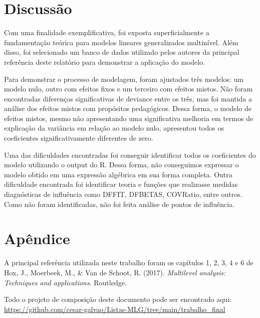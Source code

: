 \documentclass[
  letterpaper,
  DIV=11,
  numbers=noendperiod]{scrartcl}
\begin{document}
\newpage{}

\hypertarget{discussuxe3o}{%
\section{Discussão}\label{discussuxe3o}}

Com uma finalidade exemplificativa, foi exposta superficialmente a
fundamentação teórica para modelos lineares generalizados multinível.
Além disso, foi selecionado um banco de dados utilizado pelos autores da
principal referência deste relatório para demonstrar a aplicação do
modelo.

Para demonstrar o processo de modelagem, foram ajustados três modelos:
um modelo nulo, outro com efeitos fixos e um terceiro com efeitos
mistos. Não foram encontradas diferenças significativas de deviance
entre os três, mas foi mantida a análise dos efeitos mistos com
propósitos pedagógicos. Dessa forma, o modelo de efeitos mistos, mesmo
não apresentando uma significativa melhoria em termos de explicação da
variância em relação ao modelo nulo, apresentou todos os coeficientes
significativamente diferentes de zero.

Uma das dificuldades encontradas foi conseguir identificar todos os
coeficientes do modelo utilizando o output do R. Dessa forma, não
conseguimos expressar o modelo obtido em uma expressão algébrica em sua
forma completa. Outra dificuldade encontrada foi identificar teoria e
funções que realizasse medidas diagnósticas de influência como DFFIT,
DFBETAS, COVRatio, entre outros. Como não foram identificadas, não foi
feita análise de pontos de influência.

\newpage{}

\hypertarget{apuxeandice}{%
\section{Apêndice}\label{apuxeandice}}

A principal referência utilizada neste trabalho foram os capítulos 1, 2,
3, 4 e 6 de Hox, J., Moerbeek, M., \& Van de Schoot, R. (2017).
\emph{Multilevel analysis: Techniques and applications}. Routledge.

Todo o projeto de composição deste documento pode ser encontrado aqui:
\url{https://github.com/cesar-galvao/Listas-MLG/tree/main/trabalho_final}
\end{document}
